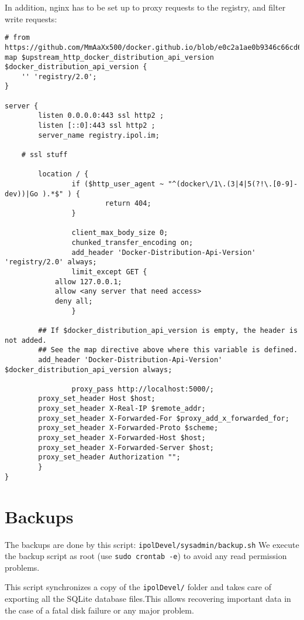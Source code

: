 \documentclass[a4paper,12pt]{article}
\begin{document}
In addition, nginx has to be set up to proxy requests to the registry, and filter write requests:

\begin{verbatim}
# from https://github.com/MmAaXx500/docker.github.io/blob/e0c2a1ae0b9346c66cd65d457cd67f130ff440cd/registry/recipes/nginx.md
map $upstream_http_docker_distribution_api_version $docker_distribution_api_version {
	'' 'registry/2.0';
}

server {
        listen 0.0.0.0:443 ssl http2 ;
        listen [::0]:443 ssl http2 ;
        server_name registry.ipol.im;

	# ssl stuff

        location / {
                if ($http_user_agent ~ "^(docker\/1\.(3|4|5(?!\.[0-9]-dev))|Go ).*$" ) {
                        return 404;
                }

                client_max_body_size 0;
                chunked_transfer_encoding on;
                add_header 'Docker-Distribution-Api-Version' 'registry/2.0' always;
                limit_except GET {
			allow 127.0.0.1;
			allow <any server that need access>
			deny all;
                }

		## If $docker_distribution_api_version is empty, the header is not added.
		## See the map directive above where this variable is defined.
		add_header 'Docker-Distribution-Api-Version' $docker_distribution_api_version always;

                proxy_pass http://localhost:5000/;
		proxy_set_header Host $host;
		proxy_set_header X-Real-IP $remote_addr;
		proxy_set_header X-Forwarded-For $proxy_add_x_forwarded_for;
		proxy_set_header X-Forwarded-Proto $scheme;
		proxy_set_header X-Forwarded-Host $host;
		proxy_set_header X-Forwarded-Server $host;
		proxy_set_header Authorization "";
        }
}
\end{verbatim}



\section{Backups}
\label{sec:backups}
The backups are done by this script: {\tt ipolDevel/sysadmin/backup.sh}
We execute the backup script as root (use {\tt sudo crontab -e}) to avoid any read permission problems.

This script synchronizes a copy of the {\tt ipolDevel/} folder and takes care of exporting all the SQLite database files.This allows recovering important data in the case of a fatal disk failure or any major problem.
\end{document}
